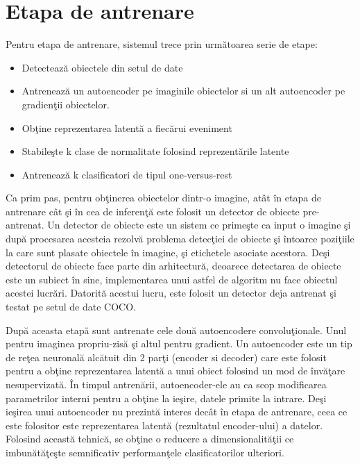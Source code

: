 \documentclass[a4paper,12pt]{report}
\begin{document}
\section{Etapa de antrenare}
Pentru etapa de antrenare, sistemul trece prin următoarea serie de etape: 
\begin{itemize}
\item Detectează obiectele din setul de date
\item Antrenează un autoencoder pe imaginile obiectelor si un alt autoencoder pe gradienţii obiectelor.
\item Obţine reprezentarea latentă a fiecărui eveniment
\item Stabileşte k clase de normalitate folosind reprezentările latente
\item Antrenează k clasificatori de tipul one-versus-rest
\end{itemize}
\par Ca prim pas, pentru obţinerea obiectelor dintr-o imagine, atât în etapa de antrenare cât şi în cea de inferenţă este folosit un detector de obiecte pre-antrenat. Un detector de obiecte este un sistem ce primeşte ca input o imagine şi după procesarea acesteia rezolvă problema detecţiei de obiecte şi întoarce poziţiile la care sunt plasate obiectele în imagine, şi etichetele asociate acestora. Deşi detectorul de obiecte face parte din arhitectură, deoarece detectarea de obiecte este un subiect în sine, implementarea unui astfel de algoritm nu face obiectul acestei lucrări. Datorită acestui lucru, este folosit un detector deja antrenat şi testat pe setul de date COCO. 
\par După aceasta etapă sunt antrenate cele două autoencodere convoluţionale. Unul pentru imaginea propriu-zisă şi altul pentru gradient. Un autoencoder este un tip de reţea neuronală alcătuit din 2 parţi (encoder si decoder) care este folosit pentru a obţine reprezentarea latentă a unui obiect folosind un mod de învăţare nesupervizată. În timpul antrenării, autoencoder-ele au ca scop modificarea parametrilor interni pentru a obţine la ieşire, datele primite la intrare. Deşi ieşirea unui autoencoder nu prezintă interes decât în etapa de antrenare, ceea ce este folositor este reprezentarea latentă (rezultatul encoder-ului) a datelor. Folosind această tehnică, se obţine o reducere a dimensionalităţii ce imbunătăţeşte semnificativ performanţele clasificatorilor ulteriori.
\par 
\end{document}
